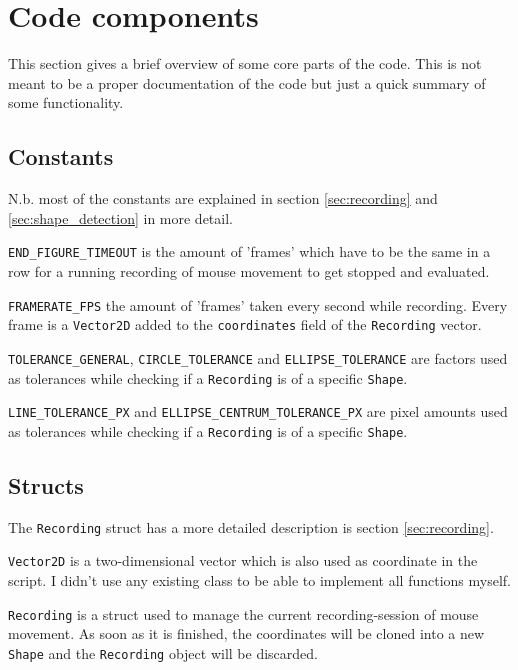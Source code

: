 \documentclass[12pt, a4paper]{article}
\begin{document}
    \section{Code components}
        This section gives a brief overview of some core parts of the code. This is not meant to be a proper documentation of the code but just a quick summary of some functionality.

        {
            \raggedright
            \subsection{Constants}
                N.b. most of the constants are explained in section \ref{sec:recording} and \ref{sec:shape_detection} in more detail.\break

                \texttt{END\_FIGURE\_TIMEOUT} is the amount of 'frames' which have to be the same in a row for a running recording of mouse movement to get stopped and evaluated.\break

                \texttt{FRAMERATE\_FPS} the amount of 'frames' taken every second while recording. Every frame is a \texttt{Vector2D} added to the \texttt{coordinates} field of the \texttt{Recording} vector.\break

                \texttt{TOLERANCE\_GENERAL}, \texttt{CIRCLE\_TOLERANCE} and \texttt{ELLIPSE\_TOLERANCE} are factors used as tolerances while checking if a \texttt{Recording} is of a specific \texttt{Shape}.\break

                \texttt{LINE\_TOLERANCE\_PX} and \texttt{ELLIPSE\_CENTRUM\_TOLERANCE\_PX} are pixel amounts used as tolerances while checking if a \texttt{Recording} is of a specific \texttt{Shape}.

            \subsection{Structs}
                \label{sec:structs}
                The \texttt{Recording} struct has a more detailed description is section \ref{sec:recording}.\break

                \texttt{Vector2D} is a two-dimensional vector which is also used as coordinate in the script. I didn't use any existing class to be able to implement all functions myself.\break

                \texttt{Recording} is a struct used to manage the current recording-session of mouse movement. As soon as it is finished, the coordinates will be cloned into a new \texttt{Shape} and the \texttt{Recording} object will be discarded.\break

}
\end{document}
